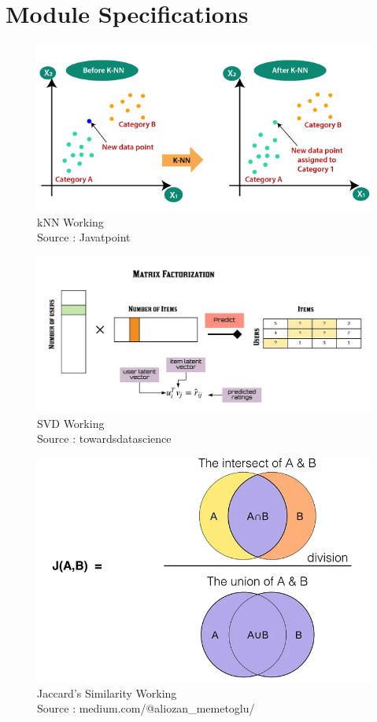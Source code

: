  \section{Module Specifications}
 \begin{figure}[h]
        \centering
        \includegraphics[width=1\linewidth]{img/Graphics/knn-arch.png}
        \caption{kNN Working\\Source : Javatpoint}
        \label{knn-arch}
    \end{figure}

    \begin{figure}[h]
        \centering
        \includegraphics[width=1\linewidth]{img/Graphics/svd-arch.png}
        \caption{SVD Working\\Source : towardsdatascience}
        \label{svd-arch}
    \end{figure}
\newpage

    \begin{figure}[h]
        \centering
        \includegraphics[width=0.8\linewidth]{img/Graphics/js-working.png}
        \caption{Jaccard's Similarity Working\\Source : medium.com/@aliozan\_memetoglu/}
        \label{js-working}
    \end{figure}
    
